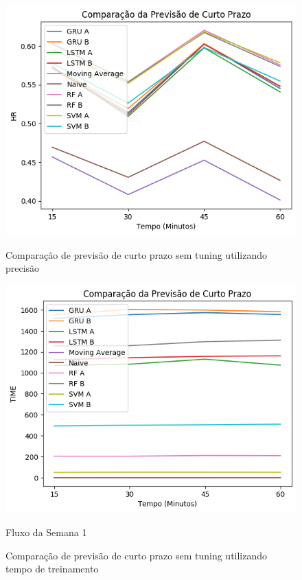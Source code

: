 \begin{figure}[htbp]
    \centering
    \includegraphics[scale=0.8]{monography/img/comparisons/comparacao_da_previsao_de_curto_prazo_hr.png}
    \label{figure:previsao_de_curto_prazo_hr}
    \caption{Comparação de previsão de curto prazo sem tuning utilizando precisão}
\end{figure}

\begin{figure}[htbp]
    \centering
    \includegraphics[scale=0.8]{monography/img/comparisons/comparacao_da_previsao_de_curto_prazo_time.png}
    \label{figure:previsao_de_curto_prazo_time}
    \caption{Fluxo da Semana 1}
    \caption{Comparação de previsão de curto prazo sem tuning utilizando tempo de treinamento}
\end{figure}

